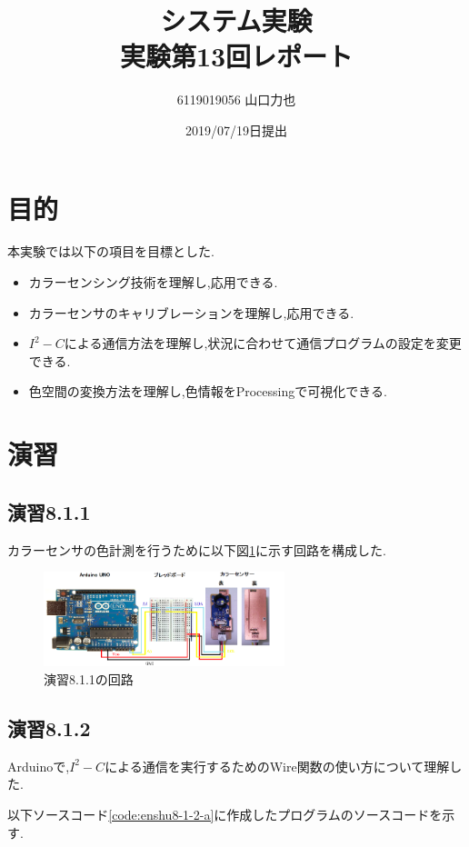 \documentclass{jarticle}
\title{{システム実験}\\実験第13回レポート}
\author{6119019056 山口力也}
\date{2019/07/19日提出}
\begin{document}
\maketitle
\section{目的}
本実験では以下の項目を目標とした.
\begin{itemize}
\item カラーセンシング技術を理解し,応用できる.
\item カラーセンサのキャリブレーションを理解し,応用できる.
\item $I^2-C$による通信方法を理解し,状況に合わせて通信プログラムの設定を変更できる.
\item 色空間の変換方法を理解し,色情報をProcessingで可視化できる.
\end{itemize}

\section{演習}
\subsection{演習8.1.1}
カラーセンサの色計測を行うために以下図\ref{fig:enshu8-1-1}に示す回路を構成した.

\begin{figure}[H]
\begin{center}
\includegraphics[width=7.0cm]{images/enshu8-1-1.png}
\caption{演習8.1.1の回路}
\label{fig:enshu8-1-1}
\end{center}
\end{figure}

\subsection{演習8.1.2}
Arduinoで,$I^2-C$による通信を実行するためのWire関数の使い方について理解した.

以下ソースコード\ref{code:enshu8-1-2-a}に作成したプログラムのソースコードを示す.


\end{document}
